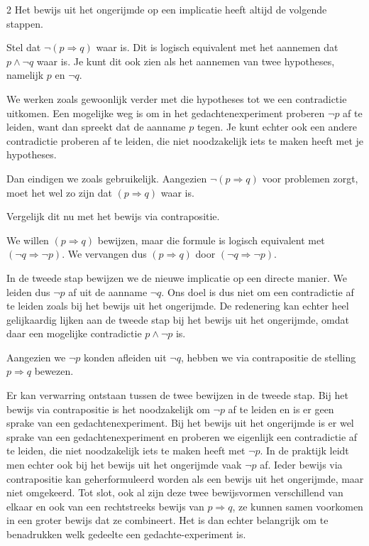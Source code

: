 \begin{multicols}{2}
Het bewijs uit het ongerijmde op een implicatie heeft altijd de volgende stappen.
\begin{opsomming}
    \item Stel dat $\lnot \left(p \Rightarrow q\right)$ waar is.
    Dit is logisch equivalent met het aannemen dat $p \land \lnot q$ waar is.
    Je kunt dit ook zien als het aannemen van twee hypotheses, namelijk $p$ en $\lnot q$.
    \item We werken zoals gewoonlijk verder met die hypotheses tot we een contradictie uitkomen.
    Een mogelijke weg is om in het gedachtenexperiment proberen $\lnot p$ af te leiden, want dan spreekt dat de aanname $p$ tegen.
    Je kunt echter ook een andere contradictie proberen af te leiden, die niet noodzakelijk iets te maken heeft met je hypotheses.
    \item Dan eindigen we zoals gebruikelijk. Aangezien $\lnot \left(p \Rightarrow q\right)$ voor problemen zorgt, moet het wel zo zijn dat $\left(p \Rightarrow q\right)$ waar is.
\end{opsomming}

Vergelijk dit nu met het bewijs via contrapositie.
\begin{opsomming}
    \item We willen $\left(p \Rightarrow q\right)$ bewijzen, maar die formule is logisch equivalent met $\left(\lnot q \Rightarrow \lnot p\right)$.
    We vervangen dus $\left(p \Rightarrow q\right)$ door $\left(\lnot q \Rightarrow \lnot p\right)$.
    \item In de tweede stap bewijzen we de nieuwe implicatie op een directe manier.
    We leiden dus $\lnot p$ af uit de aanname $ \lnot q$.
    Ons doel is dus niet om een contradictie af te leiden zoals bij het bewijs uit het ongerijmde.
    De redenering kan echter heel gelijkaardig lijken aan de tweede stap bij het bewijs uit het ongerijmde, omdat daar een mogelijke contradictie $p \land \lnot p$ is.
    \item Aangezien we $\lnot p$ konden afleiden uit $\lnot q$, hebben we via contrapositie de stelling $p \Rightarrow q$ bewezen.
\end{opsomming}
Er kan verwarring ontstaan tussen de twee bewijzen in de tweede stap.
Bij het bewijs via contrapositie is het noodzakelijk om $\lnot p$ af te leiden en is er geen sprake van een gedachtenexperiment.
Bij het bewijs uit het ongerijmde is er wel sprake van een gedachtenexperiment en proberen we eigenlijk een contradictie af te leiden, die niet noodzakelijk iets te maken heeft met $\lnot p$.
In de praktijk leidt men echter ook bij het bewijs uit het ongerijmde vaak $\lnot p$ af.
Ieder bewijs via contrapositie kan geherformuleerd worden als een bewijs uit het ongerijmde, maar niet omgekeerd.
Tot slot, ook al zijn deze twee bewijsvormen verschillend van elkaar en ook van een rechtstreeks bewijs van $p \Rightarrow q$, ze kunnen samen voorkomen in een groter bewijs dat ze combineert.
Het is dan echter belangrijk om te benadrukken welk gedeelte een gedachte-experiment is.


\end{multicols}
